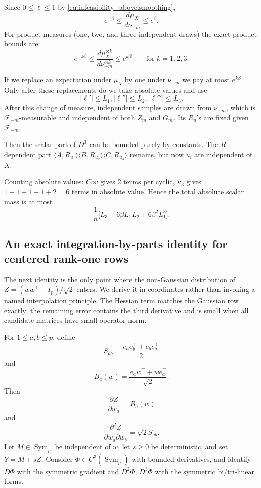 \documentclass[11pt]{article}
\numberwithin{equation}{section}
\theoremstyle{definition}
\theoremstyle{remark}
\newcommand{\1}{\boldsymbol 1}
\begin{document}
\begin{aiblock}
Since $0 \le \ell \le 1$ by \eqref{eq:infeasibility_above:smoothing},
\[
    e^{-\beta} \le \frac{d\mu_X}{d\nu_{-m}} \le e^\beta.
\]
For product measures (one, two, and three independent draws) the exact product bounds are:
\[
    e^{-k \beta} \le \frac{d\mu_X^{\otimes k}}{d\nu_{-m}^{\otimes k}} \le e^{k \beta} \qquad \text{for $k = 1, 2, 3$}.
\]

If we replace an expectation under $\mu_X$ by one under $\nu_{-m}$ we pay at most $e^{k\beta}$.
Only after these replacements do we take absolute values and use
\[
    |\ell'|\le L_1, |\ell''|\le L_2, |\ell'''|\le L_3.
\]
After this change of measure, independent samples are drawn from $\nu_{-m}$, which is ${\mathcal F}_{-m}$-measurable and independent of both $Z_m$ and $G_m$. Its $R_u$'s are fixed given ${\mathcal F}_{-m}$.

Then the scalar part of $D^3$ can be bounded purely by constants. The $R$-dependent part $\langle A,R_{u_1} \rangle \langle B, R_{u_2} \rangle \langle C, R_{u_3}\rangle$ remains, but now $u_i$ are independent of $X$.

Counting absolute values: $Cov$ gives 2 terms per cyclic, $\kappa_3$ gives $1+1+1+1+2=6$ terms in absolute value. Hence the total absolute scalar mass is at most
\[
    \frac{1}{n} \big[L_3 + 6 \beta L_1 L_2 + 6 \beta^2 L_1^3\big].
\]


\subsection{An exact integration-by-parts identity for centered rank-one rows}\label{exact-second-chaos-identity-and-interpolation}

The next identity is the only point where the non-Gaussian distribution of $Z=(ww^\top - I_p)/\sqrt2$ enters.
We derive it in coordinates rather than invoking a named interpolation principle. The Hessian term matches the Gaussian row exactly; the remaining error contains the third derivative and is small when all candidate matrices have small operator norm.

For $1\le a, b \le p$, define
\[
    S_{ab} = \frac{e_a e_b^\top + e_b e_a^\top}{2}
\]
and
\[
    B_a(w) = \frac{e_a w^\top + w e_a^\top}{\sqrt{2}}.
\]
Then
\[
    \frac{\partial Z}{\partial w_a} = B_a(w)
\]
and
\[
    \frac{\partial^2 Z}{\partial w_a \partial w_b} = \sqrt{2} S_{ab}.
\]
Let $M \in \operatorname{Sym}_p$ be independent of $w$, let $s\ge0$ be deterministic, and set $Y = M + s Z$.
Consider $\Phi\in C^3(\operatorname{Sym}_p)$ with bounded derivatives, and identify $D\Phi$ with the symmetric gradient and $D^2\Phi$, $D^3\Phi$ with the symmetric bi/tri-linear forms.


\end{aiblock}
\end{document}
